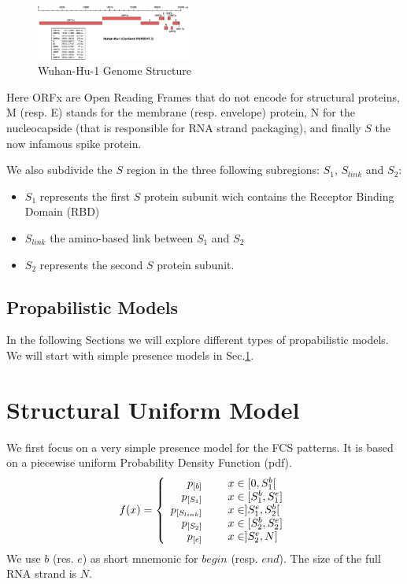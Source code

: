 \documentclass[pdflatex,sn-basic,iicol]{sn-jnl}%
\begin{document}
\begin{figure}[h]
\centering
\includegraphics[width=0.45\textwidth]{SARS-CoV-2_genome.eps}
\caption{Wuhan-Hu-1 Genome Structure}\label{wuhan-hu-1-genome}
\end{figure}

Here ORFx are Open Reading Frames that do not encode for structural proteins, 
M (resp. E) stands for the membrane (resp. envelope) protein, N for the nucleocapside (that is responsible for RNA strand packaging), 
and finally $S$ the now infamous spike protein.

We also subdivide the $S$ region in the three following subregions: $S_1$, $S_{link}$ and $S_2$:
\begin{itemize}
    \item $S_1$ represents the first $S$ protein subunit wich contains the Receptor Binding Domain (RBD)
    \item $S_{link}$ the amino-based link between $S_1$ and $S_2$
    \item $S_2$ represents the second $S$ protein subunit.
\end{itemize}

\subsection{Propabilistic Models} 
In the following Sections we will explore different types of propabilistic models. We will start with simple presence models in Sec.\ref{SUM}.

\section{Structural Uniform Model}\label{SUM}
We first focus on a very simple presence model for the FCS patterns. It is based on a piecewise uniform Probability Density Function (pdf).
\[
    f(x) = \left \{  
        \begin{array}{r c l}
            p_{[b]}         & \ & x \in [0, S_1^{b}[        \\
            p_{[S_1]}       & \ & x \in [S_1^{b}, S_1^{e}]  \\
            p_{[S_{link}]}  & \ & x \in ]S_1^{e}, S_2^{b}[  \\
            p_{[S_2]}       & \ & x \in [S_2^{b}, S_2^{e}]   \\
            p_{[e]}         & \ & x \in ]S_2^{e}, N]
        \end{array}   \right . 
\]
We use $b$ (res. $e$) as short mnemonic for $begin$ (resp. $end$). The size of the full RNA strand is $N$.
\end{document}
